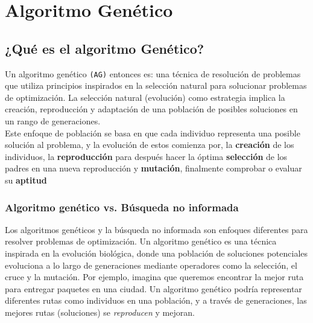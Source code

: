 \section{Algoritmo Genético}

\subsection*{¿Qué es el algoritmo Genético?}

Un algoritmo genético \texttt{(AG)} entonces es: una técnica de resolución de problemas 
que utiliza principios inspirados en la selección natural para solucionar problemas de 
optimización. La selección natural (evolución) como estrategia implica la creación, 
reproducción y adaptación de una población de posibles soluciones en un rango de generaciones.\\ 

Este enfoque de población se basa en que cada individuo representa una posible solución 
al problema, y la evolución de estos comienza por, la \textbf{creación} de los individuos, 
la \textbf{reproducción} para después hacer la óptima \textbf{selección} de los padres en 
una nueva reproducción y \textbf{mutación}, finalmente comprobar o evaluar su \textbf{aptitud}\\ 

\subsubsection*{Algoritmo genético vs. Búsqueda no informada}

Los algoritmos genéticos y la búsqueda no informada son enfoques diferentes para resolver 
problemas de optimización. Un algoritmo genético es una técnica inspirada en la evolución 
biológica, donde una población de soluciones potenciales evoluciona a lo largo de 
generaciones mediante operadores como la selección, el cruce y la mutación. Por ejemplo, 
imagina que queremos encontrar la mejor ruta para entregar paquetes en una ciudad. Un 
algoritmo genético podría representar diferentes rutas como individuos en una población, 
y a través de generaciones, las mejores rutas (soluciones) se \textit{reproducen} y mejoran.\\ 


